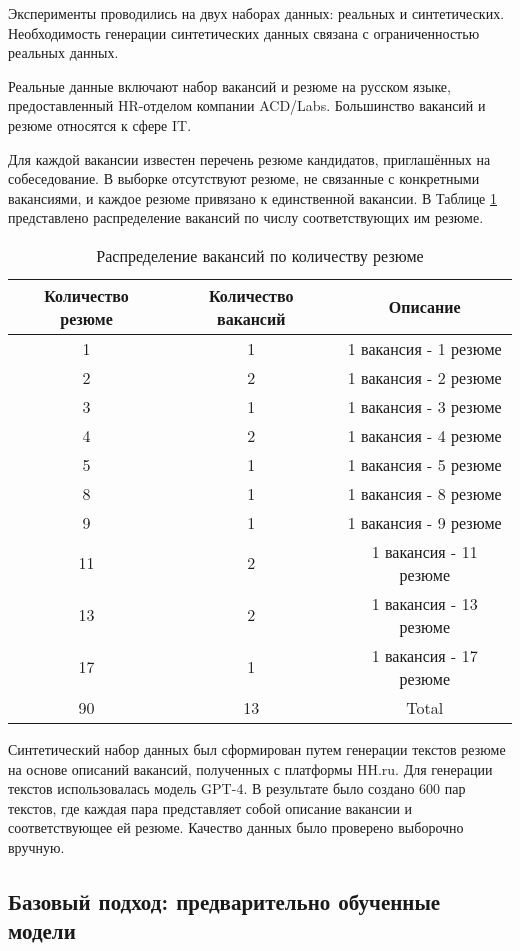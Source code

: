 \documentclass{article}
\begin{document}
Эксперименты проводились на двух наборах данных: реальных и синтетических. Необходимость генерации синтетических данных связана с ограниченностью реальных данных. 

Реальные данные включают набор вакансий и резюме на русском языке, предоставленный HR-отделом компании ACD/Labs. Большинство вакансий и резюме относятся к сфере IT.

Для каждой вакансии известен перечень резюме кандидатов, приглашённых на собеседование. В выборке отсутствуют резюме, не связанные с конкретными вакансиями, и каждое резюме привязано к единственной вакансии. В Таблице \ref{table:1} представлено распределение вакансий по числу соответствующих им резюме.

\begin{table}[h!]
\centering
\begin{tabular}{||c c c||} 
 \hline
 Количество резюме & Количество вакансий & Описание\\ [0.5ex] 
 \hline\hline
 1 & 1 & 1 вакансия - 1 резюме\\ 
 2 & 2 & 1 вакансия - 2 резюме\\
 3 & 1 & 1 вакансия - 3 резюме\\
 4 & 2 & 1 вакансия - 4 резюме\\
 5 & 1 & 1 вакансия - 5 резюме\\
 8 & 1 & 1 вакансия - 8 резюме\\
 9 & 1 & 1 вакансия - 9 резюме\\
 11 & 2 & 1 вакансия - 11 резюме\\
 13 & 2 & 1 вакансия - 13 резюме\\
 17 & 1 & 1 вакансия - 17 резюме\\
 \hline
 90 & 13 & Total\\
 \hline
\end{tabular}
\caption{Распределение вакансий по количеству резюме}
\label{table:1}
\end{table}

Синтетический набор данных был сформирован путем генерации текстов резюме на основе описаний вакансий, полученных с платформы HH.ru. Для генерации текстов использовалась модель GPT-4. В результате было создано 600 пар текстов, где каждая пара представляет собой описание вакансии и соответствующее ей резюме. Качество данных было проверено выборочно вручную.

\subsection{Базовый подход: предварительно обученные модели}
\end{document}
